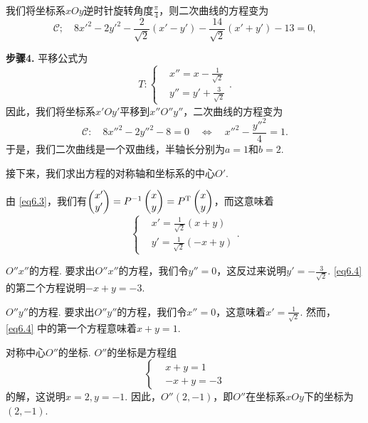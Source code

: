 我们将坐标系$xOy$逆时针旋转角度$\frac\pi4$，则二次曲线的方程变为
\[
  \mathscr C;\quad 8x'^2 - 2y'^2 - \frac2{\sqrt2}(x' - y') - \frac{14}{\sqrt2}(x' + y') - 13 = 0,
\]

{\bfseries 步骤4.}  平移公式为
\[
  T: \left\{
    \begin{aligned}
      & x'' = x - \frac1{\sqrt2} \\
      & y'' = y' + \frac3{\sqrt2}
    \end{aligned}
  \right..
\]
因此，我们将坐标系$x'Oy'$平移到$x''O''y''$，二次曲线的方程变为
\[
  \mathscr C:\quad 8x''^2 - 2y''^2 - 8 = 0 \quad \Leftrightarrow \quad x''^2 - \frac{y''^2}4 = 1.
\]
于是，我们二次曲线是一个双曲线，半轴长分别为$a=1$和$b=2$.

接下来，我们求出方程的对称轴和坐标系的中心$O'$.

由 \eqref{eq6.3}，我们有$\begin{pmatrix}
  x' \\
  y'
\end{pmatrix}=P^{-1}\begin{pmatrix}
  x \\
  y
\end{pmatrix}=P^{\mathrm T}\begin{pmatrix}
  x \\
  y
\end{pmatrix}$，而这意味着
\begin{equation}\label{eq6.4}
  \left\{
    \begin{aligned}
      & x' = \frac1{\sqrt2} (x + y) \\
      & y' = \frac1{\sqrt2} (-x + y)
    \end{aligned}
  \right..
\end{equation}

{\kaishu $O''x''$的方程.} 要求出$O''x''$的方程，我们令$y''=0$，这反过来说明$y'=-\frac3{\sqrt2}$. \eqref{eq6.4} 的第二个方程说明$-x+y=-3$.

{\kaishu $O''y''$的方程.}  要求出$O''y''$的方程，我们令$x''=0$，这意味着$x'=\frac1{\sqrt2}$. 然而， \eqref{eq6.4} 中的第一个方程意味着$x+y=1$.

{\kaishu 对称中心$O''$的坐标.} $O''$的坐标是方程组
\[
  \left\{
    \begin{aligned}
      & x + y = 1\\
      & -x + y = -3
    \end{aligned}
  \right.
\]
的解，这说明$x=2,y=-1$. 因此，$O''(2,-1)$，即$O''$在坐标系$xOy$下的坐标为$(2,-1)$.

